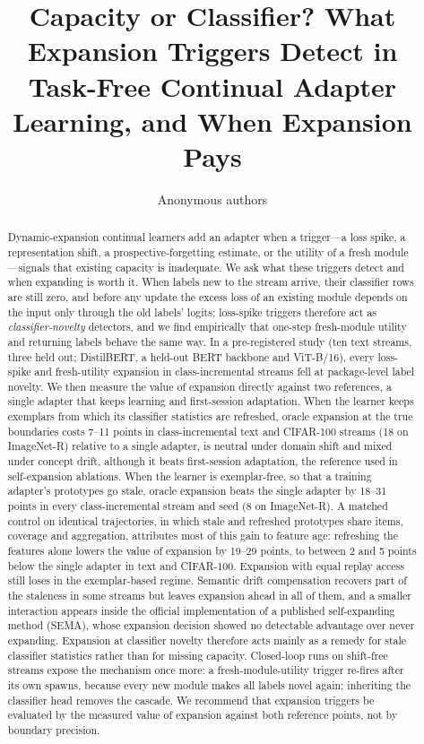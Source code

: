 \documentclass[10pt]{article}
\title{Capacity or Classifier? What Expansion Triggers Detect in\\Task-Free Continual Adapter Learning, and When Expansion Pays}
\author{Anonymous authors}
\begin{document}
\maketitle

\begin{abstract}
Dynamic-expansion continual learners add an adapter when a trigger---a loss spike, a representation shift, a prospective-forgetting estimate, or the utility of a fresh module---signals that existing capacity is inadequate. We ask what these triggers detect and when expanding is worth it. When labels new to the stream arrive, their classifier rows are still zero, and before any update the excess loss of an existing module depends on the input only through the old labels' logits; loss-spike triggers therefore act as \emph{classifier-novelty} detectors, and we find empirically that one-step fresh-module utility and returning labels behave the same way. In a pre-registered study (ten text streams, three held out; DistilBERT, a held-out BERT backbone and ViT-B/16), every loss-spike and fresh-utility expansion in class-incremental streams fell at package-level label novelty. We then measure the value of expansion directly against two references, a single adapter that keeps learning and first-session adaptation. When the learner keeps exemplars from which its classifier statistics are refreshed, oracle expansion at the true boundaries costs 7--11 points in class-incremental text and CIFAR-100 streams (18 on ImageNet-R) relative to a single adapter, is neutral under domain shift and mixed under concept drift, although it beats first-session adaptation, the reference used in self-expansion ablations. When the learner is exemplar-free, so that a training adapter's prototypes go stale, oracle expansion beats the single adapter by 18--31 points in every class-incremental stream and seed (8 on ImageNet-R). A matched control on identical trajectories, in which stale and refreshed prototypes share items, coverage and aggregation, attributes most of this gain to feature age: refreshing the features alone lowers the value of expansion by 19--29 points, to between 2 and 5 points below the single adapter in text and CIFAR-100. Expansion with equal replay access still loses in the exemplar-based regime. Semantic drift compensation recovers part of the staleness in some streams but leaves expansion ahead in all of them, and a smaller interaction appears inside the official implementation of a published self-expanding method (SEMA), whose expansion decision showed no detectable advantage over never expanding. Expansion at classifier novelty therefore acts mainly as a remedy for stale classifier statistics rather than for missing capacity. Closed-loop runs on shift-free streams expose the mechanism once more: a fresh-module-utility trigger re-fires after its own spawns, because every new module makes all labels novel again; inheriting the classifier head removes the cascade. We recommend that expansion triggers be evaluated by the measured value of expansion against both reference points, not by boundary precision.
\end{abstract}
\end{document}
